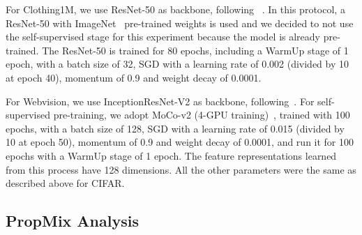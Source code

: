 \documentclass{bmvc2k}
\begin{document}
For Clothing1M, we use ResNet-50 as backbone, following ~\citep{DivideMix}. In this protocol, a ResNet-50 with ImageNet~\citep{deng2009imagenet} pre-trained weights is used and we decided to not use the self-supervised stage for this experiment because the model is already pre-trained. The ResNet-50 is trained for 80 epochs, including a WarmUp stage of 1 epoch, with a batch size of 32, SGD with a learning rate of 0.002 (divided by 10 at epoch 40), momentum of 0.9 and weight decay of 0.0001.

For Webvision, we use InceptionResNet-V2 as backbone, following~\citep{DivideMix}. For self-supervised pre-training, we adopt MoCo-v2 (4-GPU training)~\citep{MoCoV2}, trained with 100 epochs, with a batch size of 128, SGD with a learning rate of 0.015 (divided by 10 at epoch 50), momentum of 0.9 and weight decay of 0.0001, and run it for 100 epochs with a WarmUp stage of 1 epoch. The feature representations learned from this process have 128 dimensions. All the other parameters were the same as described above for CIFAR. 





\subsection{PropMix Analysis}
\label{sec:analysis} 
\end{document}
